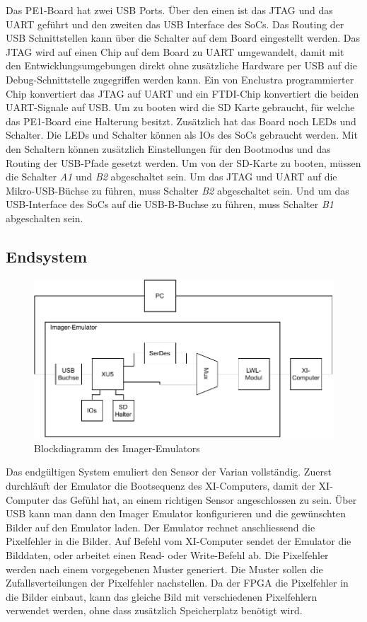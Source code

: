 \documentclass{article}
\begin{document}
Das PE1-Board hat zwei USB Ports. Über den einen ist das JTAG und das UART geführt und den zweiten das USB Interface des SoCs. Das Routing der USB Schnittstellen kann über die Schalter auf dem Board eingestellt werden. Das JTAG wird auf einen Chip auf dem Board zu UART umgewandelt, damit mit den Entwicklungsumgebungen direkt ohne zusätzliche Hardware per USB auf die Debug-Schnittstelle zugegriffen werden kann. Ein von Enclustra programmierter Chip konvertiert das JTAG auf UART und ein FTDI-Chip konvertiert die beiden UART-Signale auf USB. Um zu booten wird die SD Karte gebraucht, für welche das PE1-Board eine Halterung besitzt. Zusätzlich hat das Board noch LEDs und Schalter. Die LEDs und Schalter können als IOs des SoCs gebraucht werden. Mit den Schaltern können zusätzlich Einstellungen für den Bootmodus und das Routing der USB-Pfade gesetzt werden. Um von der SD-Karte zu booten, müssen die Schalter \textit{A1} und \textit{B2} abgeschaltet sein. Um das JTAG und UART auf die Mikro-USB-Büchse zu führen, muss Schalter \textit{B2} abgeschaltet sein. Und um das USB-Interface des SoCs auf die USB-B-Buchse zu führen, muss Schalter \textit{B1} abgeschalten sein. 


\subsection{Endsystem}
\begin{figure}[tb]
    \includegraphics[width=\linewidth]{drawio/bd_top}
    \caption{Blockdiagramm des Imager-Emulators}
    \label{fig:bd_top}
\end{figure}

Das endgültigen System emuliert den Sensor der Varian vollständig. Zuerst durchläuft der Emulator die Bootsequenz des XI-Computers, damit der XI-Computer das Gefühl hat, an einem richtigen Sensor angeschlossen zu sein. Über USB kann man dann den Imager Emulator konfigurieren und die gewünschten Bilder auf den Emulator laden. Der Emulator rechnet anschliessend die Pixelfehler in die Bilder. Auf Befehl vom XI-Computer sendet der Emulator die Bilddaten, oder arbeitet einen Read- oder Write-Befehl ab. Die Pixelfehler werden nach einem vorgegebenen Muster generiert. Die Muster sollen die Zufallsverteilungen der Pixelfehler nachstellen. Da der FPGA die Pixelfehler in die Bilder einbaut, kann das gleiche Bild mit verschiedenen Pixelfehlern verwendet werden, ohne dass zusätzlich Speicherplatz benötigt wird.
\end{document}
